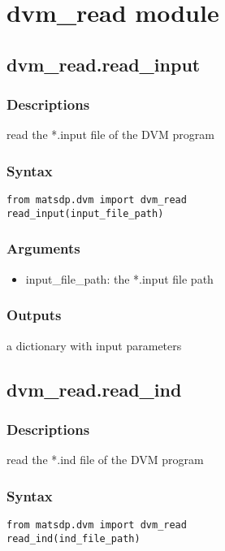 \documentclass[12pt]{book}
\begin{document}
\section{dvm\_read module}

\subsection{dvm\_read.read\_input}

\subsubsection{Descriptions}
read the *.input file of the DVM program
\subsubsection{Syntax}
\begin{lstlisting}
from matsdp.dvm import dvm_read
read_input(input_file_path)
\end{lstlisting}

\subsubsection{Arguments}
\begin{itemize}
\item input\_file\_path: the *.input file path
\end{itemize}

\subsubsection{Outputs}
a dictionary with input parameters

\subsection{dvm\_read.read\_ind}

\subsubsection{Descriptions}
read the *.ind file of the DVM program
\subsubsection{Syntax}
\begin{lstlisting}
from matsdp.dvm import dvm_read
read_ind(ind_file_path)
\end{lstlisting}
\end{document}
